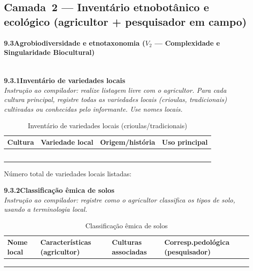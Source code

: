 \subsection{Camada~2 --- Inventário etnobotânico e ecológico (agricultor + pesquisador em campo)}

\paragraph{9.3\quad Agrobiodiversidade e etnotaxonomia ($V_2$ --- Complexidade e Singularidade Biocultural)}~\\[4pt]

\noindent\textbf{9.3.1\quad Inventário de variedades locais}\\[2pt]
\textit{Instrução ao compilador: realize listagem livre com o agricultor. Para cada cultura principal, registre todas as variedades locais (crioulas, tradicionais) cultivadas ou conhecidas pelo informante. Use nomes locais.}

\begin{table}[htbp]
\centering\small
\caption{Inventário de variedades locais (crioulas/tradicionais)}
\label{tab:app_variedades}
\begin{tabular}{p{3.2cm}p{3.5cm}p{3.5cm}p{2.5cm}}
\toprule
\textbf{Cultura} & \textbf{Variedade local} & \textbf{Origem/história} & \textbf{Uso principal} \\
\midrule
& & & \\
& & & \\
& & & \\
& & & \\
& & & \\
\bottomrule
\end{tabular}
\end{table}

\noindent Número total de variedades locais listadas: \dotfill

\medskip\noindent\textbf{9.3.2\quad Classificação êmica de solos}\\[2pt]
\textit{Instrução ao compilador: registre como o agricultor classifica os tipos de solo, usando a terminologia local.}

\begin{table}[htbp]
\centering\small
\caption{Classificação êmica de solos}
\label{tab:app_solos_emico}
\begin{tabular}{p{2.5cm}p{3.0cm}p{3.0cm}p{3.5cm}}
\toprule
\textbf{Nome local} & \textbf{Características (agricultor)} & \textbf{Culturas associadas} & \textbf{Corresp.\@ pedológica (pesquisador)} \\
\midrule
& & & \\
& & & \\
& & & \\
\bottomrule
\end{tabular}
\end{table}

